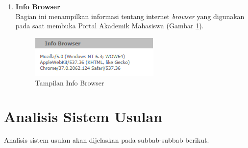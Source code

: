 \begin{enumerate}
	\item \textbf{Info Browser}\\
		Bagian ini menampilkan informasi tentang internet \textit{browser} yang digunakan pada saat membuka Portal Akademik Mahasiswa (Gambar \ref{fig:3_pam_utama_infobrowser}). 
		\begin{figure}[H]
				\centering
				\includegraphics[scale=0.75]{Gambar/pam-utama-infobrowser}
				\caption{Tampilan Info Browser} 
				\label{fig:3_pam_utama_infobrowser}
			\end{figure}
\end{enumerate}

\section{Analisis Sistem Usulan}
Analisis sistem usulan akan dijelaskan pada subbab-subbab berikut.

